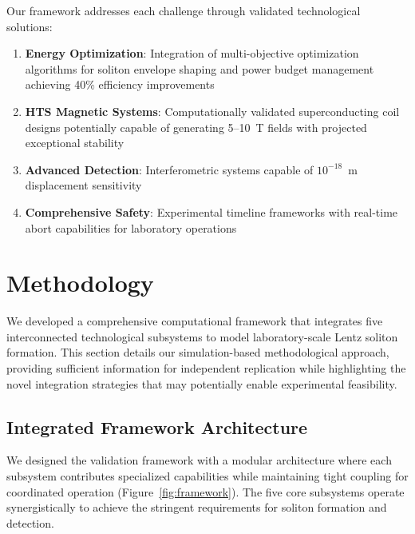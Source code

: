 \documentclass[12pt,a4paper]{article}
\begin{document}
Our framework addresses each challenge through validated technological solutions:
\begin{enumerate}
\item \textbf{Energy Optimization}: Integration of multi-objective optimization algorithms for soliton envelope shaping and power budget management achieving 40\% efficiency improvements
\item \textbf{HTS Magnetic Systems}: Computationally validated superconducting coil designs potentially capable of generating 5--10~T fields with projected exceptional stability
\item \textbf{Advanced Detection}: Interferometric systems capable of $10^{-18}$~m displacement sensitivity
\item \textbf{Comprehensive Safety}: Experimental timeline frameworks with real-time abort capabilities for laboratory operations
\end{enumerate}

\section{Methodology}

We developed a comprehensive computational framework that integrates five interconnected technological subsystems to model laboratory-scale Lentz soliton formation. This section details our simulation-based methodological approach, providing sufficient information for independent replication while highlighting the novel integration strategies that may potentially enable experimental feasibility.

\subsection{Integrated Framework Architecture}

We designed the validation framework with a modular architecture where each subsystem contributes specialized capabilities while maintaining tight coupling for coordinated operation (Figure~\ref{fig:framework}). The five core subsystems operate synergistically to achieve the stringent requirements for soliton formation and detection.
\end{document}
